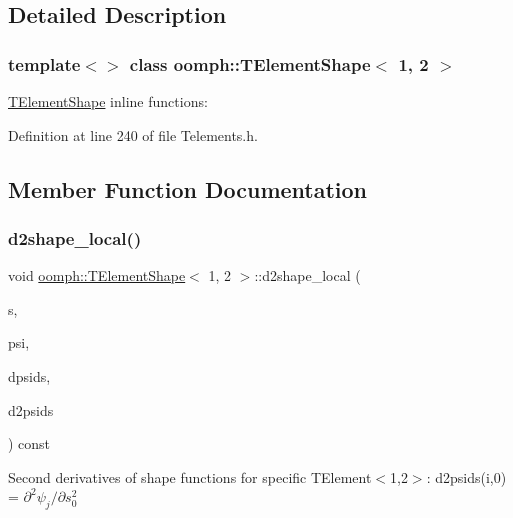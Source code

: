 \subsection{Detailed Description}
\subsubsection*{template$<$$>$\newline
class oomph\+::\+T\+Element\+Shape$<$ 1, 2 $>$}

\hyperlink{classoomph_1_1TElementShape}{T\+Element\+Shape} inline functions\+: 

Definition at line 240 of file Telements.\+h.



\subsection{Member Function Documentation}
\mbox{\label{classoomph_1_1TElementShape_3_011_00_012_01_4_ab539b7d570121e8f4b3eccaf4e1cff79}} 
\subsubsection{\texorpdfstring{d2shape\+\_\+local()}{d2shape\_local()}}
{\footnotesize\ttfamily void \hyperlink{classoomph_1_1TElementShape}{oomph\+::\+T\+Element\+Shape}$<$ 1, 2 $>$\+::d2shape\+\_\+local (\begin{DoxyParamCaption}\item[{const \hyperlink{classoomph_1_1Vector}{Vector}$<$ double $>$ \&}]{s,  }\item[{\hyperlink{classoomph_1_1Shape}{Shape} \&}]{psi,  }\item[{\hyperlink{classoomph_1_1DShape}{D\+Shape} \&}]{dpsids,  }\item[{\hyperlink{classoomph_1_1DShape}{D\+Shape} \&}]{d2psids }\end{DoxyParamCaption}) const\hspace{0.3cm}{\ttfamily [inline]}}

Second derivatives of shape functions for specific T\+Element$<$1,2$>$\+: d2psids(i,0) = $ \partial^2 \psi_j / \partial s_0^2 $ 

